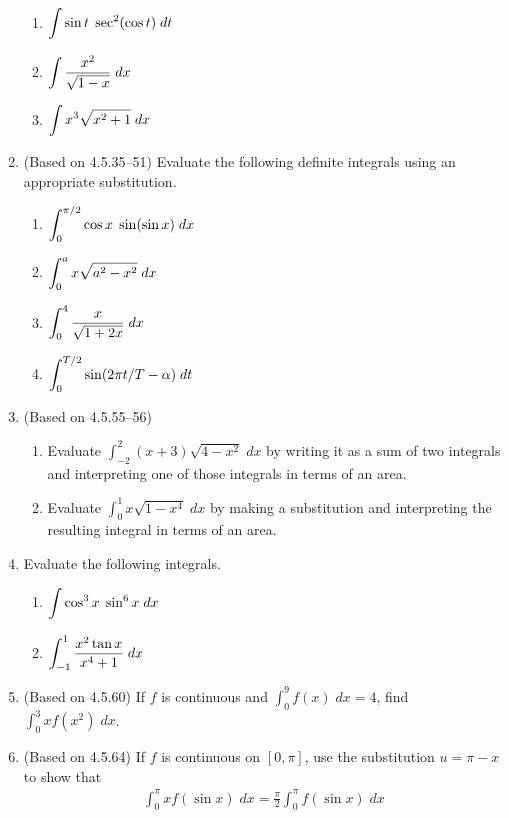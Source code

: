\documentclass{article}
\newcommand{\ds}{\displaystyle}
\begin{document}
\begin{enumerate}
\begin{multicols}{4}
\begin{enumerate}
  \item $\ds \int \sin t \; \sec^2(\cos t) \; dt
    \vphantom{\frac{x}{\sqrt{x}}}$
  \item $\ds \int \frac{x^2}{\sqrt{1-x}} \; dx
    \vphantom{\frac{x}{\sqrt{x}}}$
  \item $\ds \int x^3 \sqrt{x^2+1} \; dx
    \vphantom{\frac{x}{\sqrt{x}}}$
  \end{enumerate}
  \end{multicols}
\item (Based on 4.5.35--51) %
  Evaluate the following definite integrals using an appropriate
  substitution.
  \begin{multicols}{4}
  \begin{enumerate}
  \item $\ds \int_0^{\pi/2} \cos x \; \sin(\sin x) \; dx
    \vphantom{\frac{x}{\sqrt{x}}}$
  \item $\ds \int_0^a x \sqrt{a^2-x^2} \; dx
    \vphantom{\frac{x}{\sqrt{x}}}$
  \item $\ds \int_0^4 \frac{x}{\sqrt{1+2x}} \; dx
    \vphantom{\frac{x}{\sqrt{x}}}$
  \item \mbox{$\ds \int_0^{T/2} \sin(2\pi t/T-\alpha) \; dt
    \vphantom{\frac{x}{\sqrt{x}}}$}
  \end{enumerate}
  \end{multicols}
\item (Based on 4.5.55--56) %
  \begin{enumerate}
  \item Evaluate $\ds \int_{-2}^2 (x+3) \sqrt{4-x^2} \; dx$ by writing it
    as a sum of two integrals and interpreting one of those integrals in
    terms of an area.
  \item Evaluate $\ds \int_0^1 x\sqrt{1-x^4} \; dx$ by making a substitution
    and interpreting the resulting integral in terms of an area.
  \end{enumerate}
\item Evaluate the following integrals.
  \begin{multicols}{2}
    \begin{enumerate}
    \item $\ds \int \cos^3 x \; \sin^6 x \; dx
      \vphantom{\frac{x}{\sqrt{x}}}$
    \item $\ds \int_{-1}^1 \frac{x^2 \tan x}{x^4+1} \; dx
      \vphantom{\frac{x}{\sqrt{x}}}$
    \end{enumerate}
  \end{multicols}
\item (Based on 4.5.60) %
  If $f$ is continuous and $\ds \int_0^9 f(x) \; dx = 4$, find
  $\ds \int_0^3 xf(x^2) \; dx$.
\item (Based on 4.5.64) %
  If $f$ is continuous on $[0,\pi]$, use the substitution $u=\pi-x$ to
  show that
  \begin{align*}
    \int_0^\pi xf(\sin x) \; dx = \frac{\pi}{2} \int_0^\pi f(\sin x) \; dx
  \end{align*}
\end{enumerate}
\end{document}
